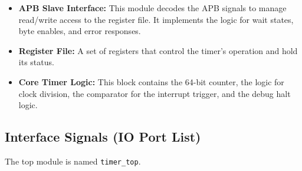 \documentclass[11pt, a4paper]{article}
\begin{document}
\begin{itemize}
    \item \textbf{APB Slave Interface:} This module decodes the APB signals to manage read/write access to the register file. It implements the logic for wait states, byte enables, and error responses.
    \item \textbf{Register File:} A set of registers that control the timer's operation and hold its status.
    \item \textbf{Core Timer Logic:} This block contains the 64-bit counter, the logic for clock division, the comparator for the interrupt trigger, and the debug halt logic.
\end{itemize}

\subsection{Interface Signals (IO Port List)}
The top module is named \texttt{timer\_top}.
\end{document}
